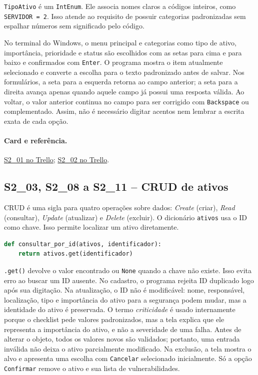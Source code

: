 \documentclass[11pt,a4paper]{article}
\newcommand{\referencia}[2]{\paragraph{Card e referência.}\href{#1}{#2}}
\newcommand{\cardsection}[1]{\Needspace{12\baselineskip}\subsection{#1}}
\begin{document}
\texttt{TipoAtivo} é um \texttt{IntEnum}. Ele associa nomes claros a códigos inteiros, como \texttt{SERVIDOR = 2}. Isso atende ao requisito de possuir categorias padronizadas sem espalhar números sem significado pelo código.

No terminal do Windows, o menu principal e categorias como tipo de ativo, importância, prioridade e status são escolhidos com as setas para cima e para baixo e confirmados com \texttt{Enter}. O programa mostra o item atualmente selecionado e converte a escolha para o texto padronizado antes de salvar. Nos formulários, a seta para a esquerda retorna ao campo anterior; a seta para a direita avança apenas quando aquele campo já possui uma resposta válida. Ao voltar, o valor anterior continua no campo para ser corrigido com \texttt{Backspace} ou complementado. Assim, não é necessário digitar acentos nem lembrar a escrita exata de cada opção.

\referencia{https://trello.com/c/ALQSY6p9}{S2\_01 no Trello}; \href{https://trello.com/c/hu3YSI6L}{S2\_02 no Trello}.

\cardsection{S2\_03, S2\_08 a S2\_11 -- CRUD de ativos}

CRUD é uma sigla para quatro operações sobre dados: \emph{Create} (criar), \emph{Read} (consultar), \emph{Update} (atualizar) e \emph{Delete} (excluir). O dicionário \texttt{ativos} usa o ID como chave. Isso permite localizar um ativo diretamente.

\begin{lstlisting}[language=Python,caption={Busca direta pela chave do dicionário}]
def consultar_por_id(ativos, identificador):
    return ativos.get(identificador)
\end{lstlisting}

\texttt{.get()} devolve o valor encontrado ou \texttt{None} quando a chave não existe. Isso evita erro ao buscar um ID ausente. No cadastro, o programa rejeita ID duplicado logo após sua digitação. Na atualização, o ID não é modificável: nome, responsável, localização, tipo e importância do ativo para a segurança podem mudar, mas a identidade do ativo é preservada. O termo \emph{criticidade} é usado internamente porque o checklist pede valores padronizados, mas a tela explica que ele representa a importância do ativo, e não a severidade de uma falha. Antes de alterar o objeto, todos os valores novos são validados; portanto, uma entrada inválida não deixa o ativo parcialmente modificado. Na exclusão, a tela mostra o alvo e apresenta uma escolha com \texttt{Cancelar} selecionado inicialmente. Só a opção \texttt{Confirmar} remove o ativo e sua lista de vulnerabilidades.
\end{document}
